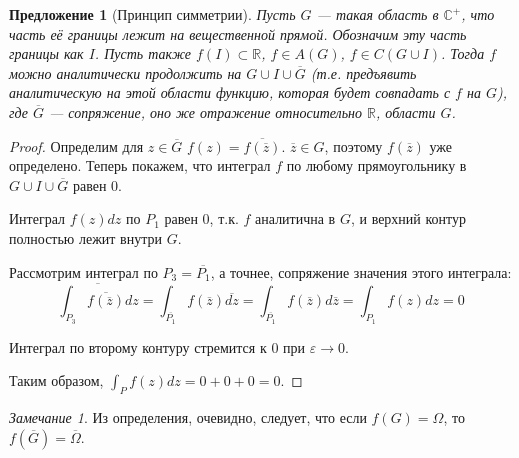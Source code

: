 \documentclass[12pt]{article}
\newcommand{\R}{\mathbb{R}}
\renewcommand{\C}{\mathbb{C}}
\newcommand{\union}{\cup}
\newcounter{cnt}
\theoremstyle{thmnote}
\newtheorem{proposition}[cnt]{Предложение}
\theoremstyle{remark}
\newtheorem*{remark}{Замечание}
\theoremstyle{defnote}
\begin{document}
\begin{proposition}[Принцип симметрии]
\label{simm}
    Пусть $G$ --- такая область в $\C^+$, что часть её границы лежит на вещественной прямой. Обозначим эту часть границы как $I$. Пусть также $f(I) \subset \R$, $f \in A(G)$, $f \in C(G \union I)$. Тогда $f$ можно аналитически продолжить на $G \union I \union \overline{G}$ (т.е. предъявить аналитическую на этой области функцию, которая будет совпадать с $f$ на $G$), где $\overline{G}$ --- сопряжение, оно же отражение относительно $\R$, области $G$.
    \begin{center}
    \begin{tikzpicture}
        
    \end{tikzpicture}
    \end{center}
\end{proposition}
\begin{proof}
    Определим для $z \in \overline{G}$ $f(z) = \overline{f(\overline{z})}$. $\overline{z} \in G$, поэтому $f(\overline{z})$ уже определено. Теперь покажем, что интеграл $f$ по любому прямоугольнику в $G \union I \union \overline{G}$ равен 0.
    \begin{center}
    \begin{tikzpicture}
        
    \end{tikzpicture}
    \end{center}
    Интеграл $f(z)dz$ по $P_1$ равен 0, т.к. $f$ аналитична в $G$, и верхний контур полностью лежит внутри $G$.

    Рассмотрим интеграл по $P_3 = \overline{P_1}$, а точнее, сопряжение значения этого интеграла:
    \begin{equation*}
        \overline{\int_{P_3} \overline{f(\overline{z})} dz} = \int_{\overline{P_1}} f(\overline{z}) \overline{dz} = \int_{\overline{P_1}} f(\overline{z}) d\overline{z} = \int_{P_1} f(z) dz = 0
    \end{equation*}

    Интеграл по второму контуру стремится к 0 при $\varepsilon \to 0$.

    Таким образом, $\int_P f(z)dz = 0 + 0 + 0 = 0$.
\end{proof}

\begin{remark}
    Из определения, очевидно, следует, что если $f(G) = \Omega$, то $f(\overline{G}) = \overline{\Omega}$.
    \begin{center}
    \begin{tikzpicture}
        
    \end{tikzpicture}
    \end{center}
\end{remark}
\end{document}
